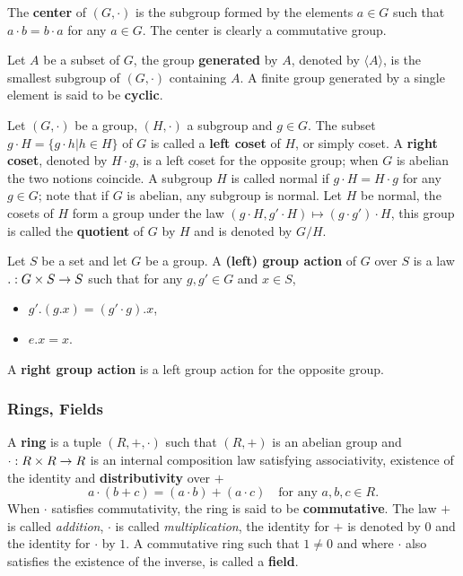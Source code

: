The  \textbf{center} of
$(G,\cdot)$ is the subgroup formed by the elements $a\in G$ such that
$a\cdot b=b\cdot a$ for any $a\in G$. The center is clearly a
commutative group.

Let $A$ be a subset of $G$, the group
\textbf{generated}
by $A$, denoted by $\langle A\rangle$, is the smallest subgroup of
$(G,\cdot)$ containing $A$. A finite group generated by a single
element is said to be
\textbf{cyclic}.

Let $(G,\cdot)$ be a group, $(H,\cdot)$ a subgroup and $g\in G$. The
subset $g\cdot H = \{g\cdot h | h \in H \}$ of $G$ is called a
\textbf{left coset} of $H$, or simply
coset. A \textbf{right coset},
denoted by $H\cdot g$, is a left coset for the opposite group; when
$G$ is abelian the two notions coincide. A subgroup $H$ is called
normal if $g\cdot H=H\cdot g$ for any $g\in G$;
note that if $G$ is abelian, any subgroup is normal. Let $H$ be
normal, the cosets of $H$ form a group under the law $(g\cdot
H,g'\cdot H)\mapsto (g\cdot g')\cdot H$, this group is called the
\textbf{quotient} of $G$ by $H$ and is
denoted by $G/H$.

Let $S$ be a set and let $G$ be a group. A
\textbf{(left) group action} of $G$ over $S$ is a
law $.:G\times S\rightarrow S$ such that for any $g,g'\in G$ and $x\in S$,
\begin{itemize}
\item $g'.(g.x) = (g'\cdot g). x$,
\item $e. x = x$.
\end{itemize}
A \textbf{right group action}
is a left group action for the opposite group.


\subsubsection{Rings, Fields}

A \textbf{ring} is a tuple $(R,+,\cdot)$ such that $(R,+)$
is an abelian group and $\cdot:R\times R\rightarrow R$ is an internal
composition law satisfying associativity, existence of the identity
and \textbf{distributivity} over $+$
\[a \cdot (b + c) = (a\cdot b) + (a\cdot c) \quad\text{for any
  $a,b,c\in R$.}\] When $\cdot$ satisfies commutativity, the ring is
said to be \textbf{commutative}.  The law $+$
is called \emph{addition}, $\cdot$ is called \emph{multiplication},
the identity for $+$ is denoted by $0$ and the identity for $\cdot$ by
$1$.  A commutative ring such that $1\ne 0$ and where $\cdot$ also
satisfies the existence of the inverse, is called a
\textbf{field}.

